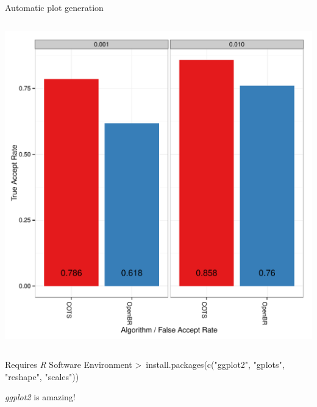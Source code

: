 \documentclass[12pt]{beamer}
\begin{document}
\begin{frame}
\begin{block}{Automatic plot generation}
\begin{columns}
    \includegraphics[width=\textwidth]{img/MEDS/MEDS_BC}
\end{columns}
\end{block}
\pause
\begin{block}{Requires \emph{R} Software Environment}
\textgreater \ install.packages(c("ggplot2", "gplots", "reshape", "scales"))
\end{block}
\pause
\begin{center}
\emph{ggplot2} is amazing!
\end{center}
\end{frame}
\end{document}
